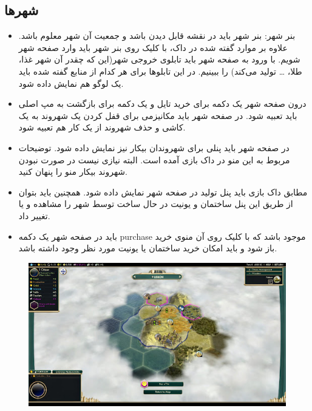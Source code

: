\documentclass[]{article}
\begin{document}
\subsection*{{\titr شهرها}}

\begin{itemize}
\item بنر شهر: بنر شهر باید در نقشه قابل دیدن باشد و جمعیت آن شهر معلوم باشد. علاوه بر موارد گفته شده در داک، با کلیک روی بنر شهر باید وارد صفحه شهر شویم. با ورود به صفحه شهر باید تابلوی خروجی شهر(این که چقدر آن شهر غذا، طلا، … تولید می‌کند) را ببینیم. در این تابلوها برای هر کدام از منابع گفته شده باید یک لوگو هم نمایش داده شود.

\item درون صفحه شهر یک دکمه برای خرید تایل و یک دکمه برای بازگشت به مپ اصلی باید تعبیه شود. در صفحه شهر باید مکانیزمی برای قفل کردن یک شهروند به یک کاشی و حذف شهروند از یک کار هم تعبیه شود.

\item در صفحه شهر باید پنلی برای شهروندان بیکار نیز نمایش داده شود. توضیحات مربوط به این منو در داک بازی آمده است. البته نیازی نیست در صورت نبودن شهروند بیکار منو را پنهان کنید.

\item مطابق داک بازی باید پنل تولید در صفحه شهر نمایش داده شود. همچنین باید بتوان از طریق این پنل ساختمان و یونیت در حال ساخت توسط شهر را مشاهده و یا تغییر داد.

\item باید در صفحه شهر یک دکمه purchase موجود باشد که با کلیک روی آن منوی خرید باز شود و باید امکان خرید ساختمان یا یونیت مورد نظر وجود داشته باشد.

\end{itemize}

\begin{figure}[H]
    \centerline{\includegraphics[scale=0.8]{resources/cities.jpg}}
\end{figure}
\end{document}
